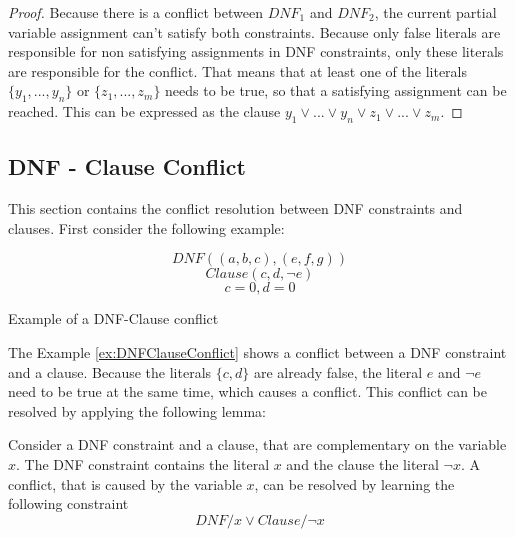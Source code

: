 \begin{proof}
Because there is a conflict between $DNF_1$ and $DNF_2$, the current partial variable assignment can't satisfy both constraints. Because only false literals are responsible for non satisfying assignments in DNF constraints, only these literals are responsible for the conflict. That means that at least one of the literals $\{y_1,...,y_n\}$ or $\{z_1,...,z_m\}$ needs to be true, so that a satisfying assignment can be reached. This can be expressed as the clause $y_1 \vee ... \vee y_n \vee z_1 \vee ... \vee z_m$.
\end{proof}

\subsection{DNF - Clause Conflict}

This section contains the conflict resolution between DNF constraints and clauses. First consider the following example:

\begin{example}
\begin{leftbar}
\begin{displaymath}
DNF((a,b,c),(e,f,g))
\end{displaymath}
\begin{displaymath}
Clause(c,d,\neg e)
\end{displaymath}
\begin{displaymath}
c = 0, d = 0
\end{displaymath}
\end{leftbar}
\caption{Example of a DNF-Clause conflict}
\label{ex:DNFClauseConflict}
\end{example}

The Example \ref{ex:DNFClauseConflict} shows a conflict between a DNF constraint and a clause. Because the literals $\{c,d\}$ are already false, the literal $e$ and $\neg e$ need to be true at the same time, which causes a conflict. This conflict can be resolved by applying the following lemma:



\begin{lemma}
\begin{leftbar}
Consider a DNF constraint and a clause, that are complementary on the variable $x$. The DNF constraint contains the literal $x$ and the clause the literal $\neg x$. A conflict, that is caused by the variable $x$, can be resolved by learning the following constraint
\begin{displaymath}
DNF / x \vee Clause / \neg x
\end{displaymath}
\end{leftbar}
\label{le:DNFClauseConflict}
\end{lemma}

